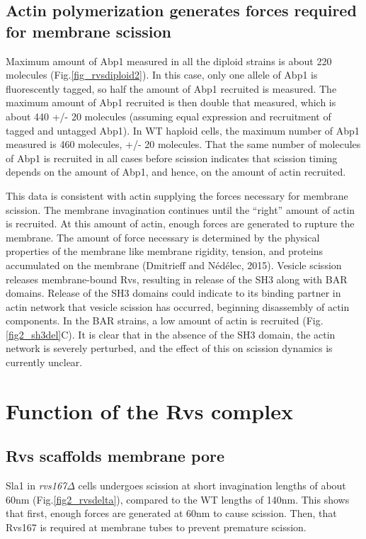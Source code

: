 \subsection{ Actin polymerization generates forces required for membrane scission}
Maximum amount of Abp1 measured in all the diploid strains is about 220 molecules (Fig.\ref{fig_rvsdiploid2}). In this case, only one allele of Abp1 is fluorescently tagged, so half the amount of Abp1 recruited is measured. The maximum amount of Abp1 recruited is then double that measured, which is about 440 +/- 20 molecules (assuming equal expression and recruitment of tagged and untagged Abp1). In WT haploid cells, the maximum number of Abp1 measured is 460 molecules, +/- 20 molecules. That the same number of molecules of Abp1 is recruited in all cases before scission indicates that scission timing depends on the amount of Abp1, and hence, on the amount of actin recruited. 

\vspace{5mm}
This data is consistent with actin supplying the forces necessary for membrane scission. The membrane invagination continues until the “right” amount of actin is recruited. At this amount of actin, enough forces are generated to rupture the membrane. The amount of force necessary is determined by the physical properties of the membrane like membrane rigidity, tension, and proteins accumulated on the membrane (Dmitrieff and Nédélec, 2015). Vesicle scission releases membrane-bound Rvs, resulting in release of the SH3 along with BAR domains. Release of the SH3 domains could indicate to its binding partner in actin network that vesicle scission has occurred, beginning disassembly of actin components. In the BAR strains, a low amount of actin is recruited (Fig.\ref{fig2_sh3del}C). It is clear that in the absence of the SH3 domain, the actin network is severely perturbed, and the effect of this on scission dynamics is currently unclear. 

\section{Function of the Rvs complex}

\subsection{Rvs scaffolds membrane pore}
Sla1 in \textit{rvs167$\Delta$} cells undergoes scission at short invagination lengths of about 60nm (Fig.\ref{fig2_rvsdelta}), compared to the WT lengths of 140nm. This shows that first, enough forces are generated at 60nm to cause scission. Then, that Rvs167 is required at membrane tubes to prevent premature scission. 

